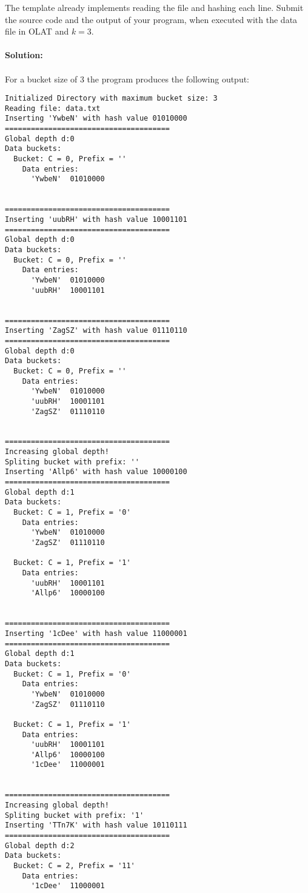 The template already implements reading the file and hashing each line.
Submit the source code and the output of your program, when executed with the data file in OLAT and $k=3$.
\\\\{\bf Solution:}\\\\
For a bucket size of 3 the program produces the following output:
\begin{lstlisting}
Initialized Directory with maximum bucket size: 3
Reading file: data.txt
Inserting 'YwbeN' with hash value 01010000
======================================
Global depth d:0
Data buckets:
  Bucket: C = 0, Prefix = ''
    Data entries:
      'YwbeN'  01010000
      

======================================
Inserting 'uubRH' with hash value 10001101
======================================
Global depth d:0
Data buckets:
  Bucket: C = 0, Prefix = ''
    Data entries:
      'YwbeN'  01010000
      'uubRH'  10001101
      

======================================
Inserting 'ZagSZ' with hash value 01110110
======================================
Global depth d:0
Data buckets:
  Bucket: C = 0, Prefix = ''
    Data entries:
      'YwbeN'  01010000
      'uubRH'  10001101
      'ZagSZ'  01110110
      

======================================
Increasing global depth!
Spliting bucket with prefix: ''
Inserting 'Allp6' with hash value 10000100
======================================
Global depth d:1
Data buckets:
  Bucket: C = 1, Prefix = '0'
    Data entries:
      'YwbeN'  01010000
      'ZagSZ'  01110110
      
  Bucket: C = 1, Prefix = '1'
    Data entries:
      'uubRH'  10001101
      'Allp6'  10000100
      

======================================
Inserting '1cDee' with hash value 11000001
======================================
Global depth d:1
Data buckets:
  Bucket: C = 1, Prefix = '0'
    Data entries:
      'YwbeN'  01010000
      'ZagSZ'  01110110
      
  Bucket: C = 1, Prefix = '1'
    Data entries:
      'uubRH'  10001101
      'Allp6'  10000100
      '1cDee'  11000001
      

======================================
Increasing global depth!
Spliting bucket with prefix: '1'
Inserting 'TTn7K' with hash value 10110111
======================================
Global depth d:2
Data buckets:
  Bucket: C = 2, Prefix = '11'
    Data entries:
      '1cDee'  11000001
      

\end{lstlisting}
